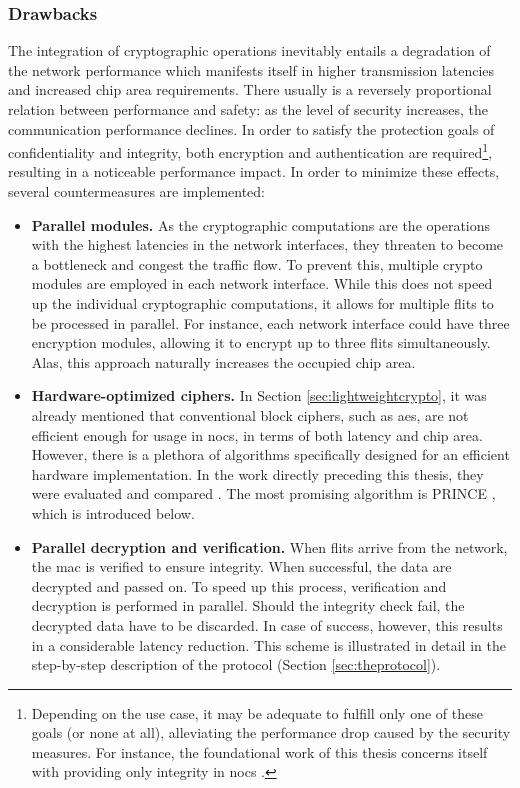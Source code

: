 \subsubsection{Drawbacks}\label{subsubsec:cryptodrawbacks}
The integration of cryptographic operations inevitably entails a degradation of the network performance which manifests itself in higher transmission
latencies and increased chip area requirements. There usually is a reversely proportional relation between performance and safety: as the level of security
increases, the communication performance declines. In order to satisfy the protection goals of confidentiality and integrity, both encryption and
authentication are required\footnote{Depending on the use case, it may be adequate to fulfill only one of these goals (or none at all), alleviating
the performance drop caused by the security measures. For instance, the foundational work of this thesis concerns itself with providing only integrity in
\glspl{noc} \cite{moriam18activeattackers}.}, resulting in a noticeable performance impact. In order to minimize these effects, several countermeasures
are implemented:
\begin{itemize}
    \item \textbf{Parallel modules.} As the cryptographic computations are the operations with the highest latencies in the network interfaces, they
        threaten to become a bottleneck and congest the traffic flow. To prevent this, multiple crypto modules are employed in each network
        interface. While this does not speed up the individual cryptographic computations, it allows for multiple flits to be processed in parallel. For
        instance, each network interface could have three encryption modules, allowing it to encrypt up to three flits simultaneously. Alas, this
        approach naturally increases the occupied chip area.
    \item \textbf{Hardware-optimized ciphers.} In Section \ref{sec:lightweightcrypto}, it was already mentioned that conventional block ciphers, such
        as \gls{aes}, are not efficient enough for usage in \glspl{noc}, in terms of both latency and chip area. However, there is a plethora of
        algorithms specifically designed for an efficient hardware implementation. In the work directly preceding this thesis, they were evaluated and
        compared \cite{harttung17lightweightcrypto}. The most promising algorithm is PRINCE \cite{borghoff12prince}, which is introduced below.
    \item \textbf{Parallel decryption and verification.} When flits arrive from the network, the \gls{mac} is verified to ensure integrity. When
        successful, the data are decrypted and passed on. To speed up this process, verification and decryption is performed in parallel. Should the
        integrity check fail, the decrypted data have to be discarded. In case of success, however, this results in a considerable latency reduction.
        This scheme is illustrated in detail in the step-by-step description of the protocol (Section \ref{sec:theprotocol}).
\end{itemize}

